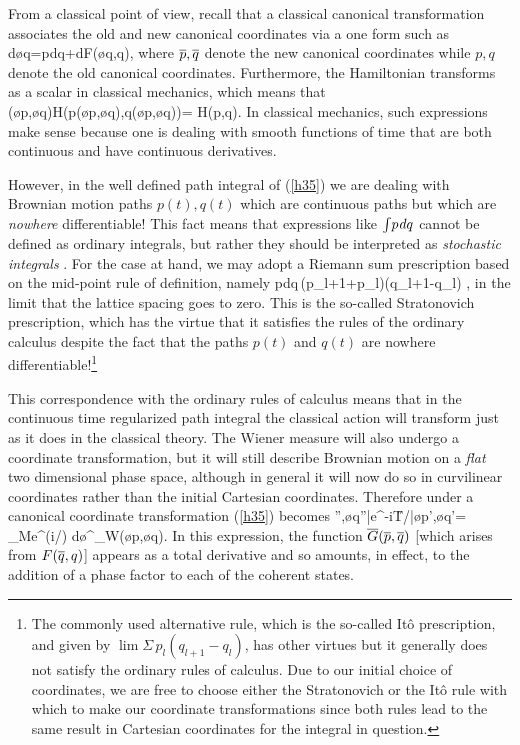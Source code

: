 {}From a classical point of view, recall that a classical canonical 
transformation associates the old and new canonical coordinates via a 
one form such as
  \,d{\o q}=p\s dq+dF({\o q},q)\;,  \en
where ${\overline p},{\overline q}$ denote the new canonical coordinates while $p,q$ 
denote the old canonical coordinates. Furthermore, the Hamiltonian 
transforms as a scalar in classical mechanics, which means that
  ({\o p},{\o q})\equiv H(p({\o p},{\o q}),q({\o p},{\o q}))=
H(p,q)\;. \en
In classical mechanics, such expressions make sense because one is dealing 
with smooth functions of time that are both continuous and have continuous 
derivatives. 

However, in the well defined path integral of (\ref{h35}) we are dealing 
with Brownian motion paths $p(t),q(t)$ which are continuous paths but 
which are {\it nowhere} differentiable! This fact means that expressions 
like ${\textstyle\int} p\hskip.08em dq$ cannot be defined as ordinary integrals, but rather 
they should be interpreted as {\it stochastic integrals} \cite{jjj}. For 
the case at hand, we may adopt a Riemann sum prescription based on the 
mid-point rule of definition, namely
  \bn \tint p\s dq\equiv \lim\Sigma\,\half\s(p_{l+1}+p_l)(q_{l+1}-q_l) 
\;,  \en
in the limit that the lattice spacing goes to zero. This is the so-called 
Stratonovich prescription, which has the virtue that it satisfies the 
rules of the ordinary calculus \cite{jjj} despite the fact that the 
paths $p(t)$ and $q(t)$ are nowhere differentiable!\footnote{The 
commonly used alternative rule, which is the so-called It\^o prescription, 
and given by $\lim\Sigma\, p_l(q_{l+1}-q_l)$, has other virtues but it 
generally does not satisfy the ordinary rules of calculus. Due to our 
initial choice of coordinates, we are free to choose either the 
Stratonovich or the It\^o rule with which to make our coordinate 
transformations since both rules lead to the same result in Cartesian 
coordinates for the integral in question.} 

This correspondence with the ordinary rules of calculus means that in 
the continuous time regularized path integral the classical action will 
transform just as it does in the classical theory. The Wiener measure 
will also undergo a coordinate transformation, but it will still 
describe Brownian motion on a {\it flat} two dimensional phase space, 
although in general it will now do so in curvilinear coordinates rather 
than the initial Cartesian coordinates. Therefore under a canonical 
coordinate transformation
(\ref{h35}) becomes \cite{dau,kla32}
  \bn {}'',{\o q}''|\s e^{-i\H T/\hbar}\s|{\o p}',{\o q}'\>=
\lim_{\nu\ra\infty}{\cal M}\int e^{(i/\hbar)\tint[{\o p}\s d{\o q}+
d{\o G}({\o p},{\o q})-{\o H}({\o p},{\o q})\s dt]}\;
d{\o\mu}^\nu_W({\o p},{\o q})\;. \en
In this expression, the function ${\overline G}({\overline p},{\overline q})$ [which arises 
from $F({\overline q},q)$] appears as a total derivative and so amounts, in 
effect, to the addition of a phase factor to each of the coherent states. 

